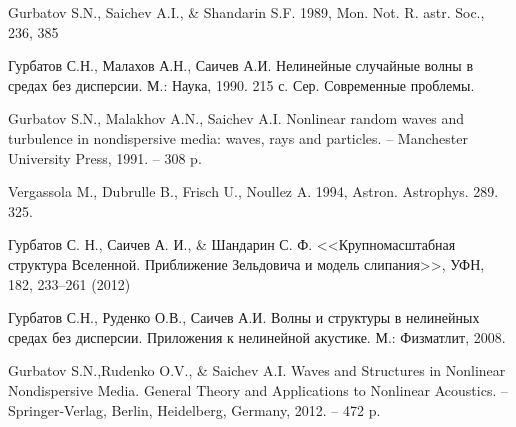 \documentclass[a4paper,14pt]{extarticle}
\theoremstyle{definition}
\begin{document}
\begin{thebibliography}{99}
 Gurbatov S.N., Saichev A.I., \& Shandarin S.F. 1989, Mon. Not. R. astr. Soc., 236, 385

 Гурбатов С.Н., Малахов А.Н., Саичев А.И. Нелинейные случайные волны в средах без дисперсии. М.: Наука, 1990. 215 с. Сер. Современные проблемы.

 Gurbatov S.N., Malakhov A.N., Saichev A.I. Nonlinear random waves and turbulence in nondispersive media: waves, rays and particles. -- Manchester University Press, 1991. -- 308 p.

 Vergassola M., Dubrulle B., Frisch U., Noullez A. 1994, Astron. Astrophys. 289. 325.

 Гурбатов С. Н., Саичев А. И., \& Шандарин С. Ф.   <<Крупномасштабная структура Вселенной. Приближение Зельдовича и модель слипания>>,  УФН, 182,  233–261 (2012)

 Гурбатов С.Н., Руденко О.В., Саичев А.И. Волны и структуры в нелинейных средах без дисперсии. Приложения к нелинейной акустике. М.: Физматлит, 2008.

 Gurbatov S.N.,Rudenko O.V., \& Saichev A.I. Waves and Structures in Nonlinear Nondispersive Media. General Theory and Applications to Nonlinear Acoustics. -- Springer-Verlag, Berlin, Heidelberg, Germany, 2012. -- 472 p.

\end{thebibliography}
\end{document}
